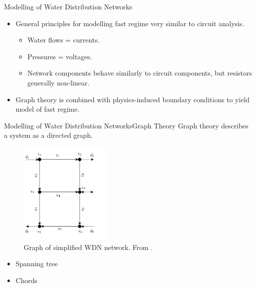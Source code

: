 
\begin{frame}{Modelling of Water Distribution Networks}
	\begin{itemize}
		\item General principles for modelling fast regime very similar to circuit analysis.
		\begin{itemize}
			\item Water flows = currents.
			\item Pressures = voltages.
			\item Network components behave similarly to circuit components, but resistors generally non-linear.
		\end{itemize}
		\item Graph theory is combined with physics-induced boundary conditions to yield model of fast regime.
	\end{itemize}
\end{frame}



\begin{frame}{Modelling of Water Distribution Networks}{Graph Theory}
	Graph theory describes a system as a directed graph.
	
	\begin{figure}[h!]
		\centering
		\includegraphics[width=0.4\textwidth]{Topics/SystemModel/Graphics/Graph.png}
		\caption{Graph of simplified WDN network. From \cite{Rathore930}.}
		\label{fig:graph}
	\end{figure}
	
	\begin{itemize}
		\item Spanning tree
		\item Chords
	\end{itemize}
	
\end{frame}


